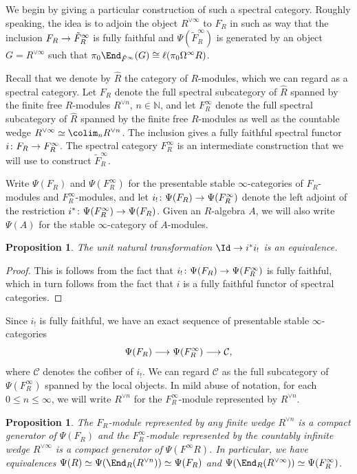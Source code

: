 \documentclass{amsart}
\renewcommand{\to}{\mathchoice{\longrightarrow}{\rightarrow}{\rightarrow}{\rightarrow}}
\let\catsymbfont\mathcal
\newcommand{\aC}{{\catsymbfont{C}}}
\renewcommand{\i}{\infty}
\numberwithin{equation}{section}
\newtheorem{proposition}[equation]{Proposition}
\theoremstyle{definition}
\begin{document}
We begin by giving a particular construction of such a spectral
category.  Roughly speaking, the idea is to adjoin the object
$R^{\lor\infty}$ to $F_R$ in such as way that the inclusion $F_R\to
\tilde{F}^\infty_R$ is fully faithful and $\Psi(\tilde{F}^\infty_R)$
is generated by an object $G=R^{\lor\infty}$ such that
$\pi_0\End_{\tilde{F}^\infty}(G)\cong\ell(\pi_0\Omega^\infty R)$. 

Recall that we denote by $\widehat{R}$ the category of
$R$-modules, which we can regard as a spectral category.  Let $F_R$
denote the full spectral subcategory of $\widehat{R}$ spanned by the
finite free $R$-modules $R^{\lor n}$, $n\in\mathbb{N}$, and let
$F^\infty_R$ denote the full spectral subcategory of $\widehat{R}$
spanned by the finite free $R$-modules as well as the countable wedge
$R^{\lor\infty}\simeq\colim_n R^{\lor n}$.  The inclusion gives a
fully faithful spectral functor $i \colon F_R\to F^\infty_R$.  The
spectral category $F^\infty_R$ is an intermediate construction that we
will use to construct $\tilde{F}_R^\infty$.

Write $\Psi(F_R)$ and $\Psi(F^\infty_R)$ for the presentable
stable $\i$-categories of $F_R$-modules and $F^\infty_R$-modules, and
let $i_! \colon \Psi(F_R)\to \Psi(F^\infty_R)$ denote the left
adjoint of the restriction $i^* \colon \Psi(F^\infty_R)\to\Psi(F_R)$.
Given an $R$-algebra $A$, we will also write $\Psi(A)$ for the stable
$\i$-category of $A$-modules. 

\begin{proposition}
The unit natural transformation $\Id\to i^*i_!$ is an equivalence.
\end{proposition}

\begin{proof}
This is follows from the fact that
$i_! \colon \Psi(F_R) \to \Psi(F^\infty_R)$ is fully faithful,
which in turn follows from the fact that $i$ is a fully faithful
functor of spectral categories.
\end{proof}

Since $i_!$ is fully faithful, we have an exact sequence of
presentable stable $\i$-categories 
\[
\Psi(F_R) \to \Psi(F^\infty_R) \to \aC,
\]
where $\aC$ denotes the cofiber of $i_!$.  We can regard $\aC$ as the
full subcategory of $\Psi(F^\infty_R)$ spanned by the local objects.
In mild abuse of notation, for each $0\leq n\leq\infty$, we will write
$R^{\lor n}$ for the $F^\infty_R$-module represented by $R^{\lor n}$.

\begin{proposition}
The $F_R$-module represented by any finite wedge $R^{\lor n}$ is a
compact generator of $\Psi(F_R)$ and the $F^\infty_R$-module
represented by the countably infinite wedge $R^{\lor\infty}$ is a compact
generator of $\Psi(F^\infty R)$.  In particular, we have
equivalences $\Psi(R)\simeq\Psi(\End_R(R^{\lor n}))\simeq\Psi(F_R)$ and
$\Psi(\End_R(R^{\lor\infty}))\simeq\Psi(F^\infty_R)$. 
\end{proposition}
\end{document}
